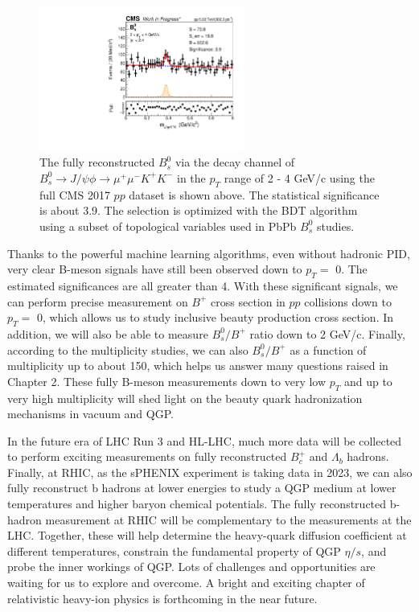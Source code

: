  \begin{figure}[hbtp]
\begin{center}
\includegraphics[width=0.60\textwidth]{Figures/Chapter6/BsLow.pdf}
\caption{The fully reconstructed $B^0_s$ via the decay channel of $B^0_s\rightarrow J/\psi \phi  \rightarrow \mu^+\mu^- K^+ K^-$ in the $p_T$ range of 2 - 4 GeV/c using the full CMS 2017 $pp$ dataset is shown above. The statistical significance is about 3.9. The selection is optimized with the BDT algorithm using a subset of topological variables used in PbPb $B^0_s$ studies.}
\label{BsLow}
\end{center}
\end{figure}   

Thanks to the powerful machine learning algorithms, even without hadronic PID, very clear B-meson signals have still been observed down to $p_T =$ 0. The estimated significances are all greater than 4. With these significant signals, we can perform precise measurement on $B^+$ cross section in $pp$ collisions down to $p_T =$ 0, which allows us to study inclusive beauty production cross section. In addition, we will also be able to measure $B^0_s/B^+$ ratio down to 2 GeV/c. Finally, according to the multiplicity studies, we can also $B^0_s/B^+$ as a function of multiplicity up to about 150, which helps us answer many questions raised in Chapter 2.  These fully B-meson measurements down to very low $p_T$ and up to very high multiplicity will shed light on the beauty quark hadronization mechanisms in vacuum and QGP.

In the future era of LHC Run 3 and HL-LHC, much more data will be collected to perform exciting measurements on fully reconstructed $B^+_c$ and $\Lambda_b$ hadrons. Finally, at RHIC, as the sPHENIX experiment is taking data in 2023, we can also fully reconstruct b hadrons at lower energies to study a QGP medium at lower temperatures and higher baryon chemical potentials. The fully reconstructed b-hadron measurement at RHIC will be complementary to the measurements at the LHC. Together, these will help determine the heavy-quark diffusion coefficient at different temperatures, constrain the fundamental property of QGP $\eta/s$, and probe the inner workings of QGP. Lots of challenges and opportunities are waiting for us to explore and overcome. A bright and exciting chapter of relativistic heavy-ion physics is forthcoming in the near future.



